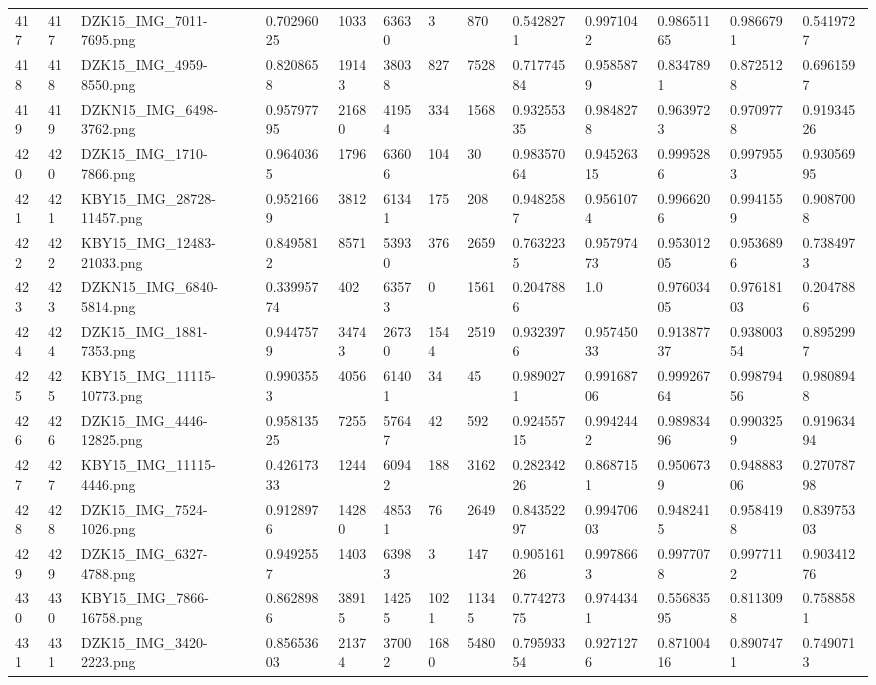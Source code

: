 \documentclass[11pt, a4paper, twoside]{report}
\begin{document}
\begin{longtable}[c]{@{}lllllllllllll@{}}
417 & 417 & DZK15\_IMG\_7011-7695.png & 0.70296025 & 1033 & 63630 & 3 & 870 & 0.5428271 & 0.9971042 & 0.98651165 & 0.9866791 & 0.5419727 \\
418 & 418 & DZK15\_IMG\_4959-8550.png & 0.8208658 & 19143 & 38038 & 827 & 7528 & 0.71774584 & 0.9585879 & 0.8347891 & 0.8725128 & 0.6961597 \\
419 & 419 & DZKN15\_IMG\_6498-3762.png & 0.95797795 & 21680 & 41954 & 334 & 1568 & 0.93255335 & 0.9848278 & 0.9639723 & 0.9709778 & 0.91934526 \\
420 & 420 & DZK15\_IMG\_1710-7866.png & 0.9640365 & 1796 & 63606 & 104 & 30 & 0.98357064 & 0.94526315 & 0.9995286 & 0.9979553 & 0.93056995 \\
421 & 421 & KBY15\_IMG\_28728-11457.png & 0.9521669 & 3812 & 61341 & 175 & 208 & 0.9482587 & 0.9561074 & 0.9966206 & 0.9941559 & 0.9087008 \\
422 & 422 & KBY15\_IMG\_12483-21033.png & 0.8495812 & 8571 & 53930 & 376 & 2659 & 0.7632235 & 0.95797473 & 0.95301205 & 0.9536896 & 0.7384973 \\
423 & 423 & DZKN15\_IMG\_6840-5814.png & 0.33995774 & 402 & 63573 & 0 & 1561 & 0.2047886 & 1.0 & 0.97603405 & 0.97618103 & 0.2047886 \\
424 & 424 & DZK15\_IMG\_1881-7353.png & 0.9447579 & 34743 & 26730 & 1544 & 2519 & 0.9323976 & 0.95745033 & 0.91387737 & 0.93800354 & 0.8952997 \\
425 & 425 & KBY15\_IMG\_11115-10773.png & 0.9903553 & 4056 & 61401 & 34 & 45 & 0.9890271 & 0.99168706 & 0.99926764 & 0.99879456 & 0.9808948 \\
426 & 426 & DZK15\_IMG\_4446-12825.png & 0.95813525 & 7255 & 57647 & 42 & 592 & 0.92455715 & 0.9942442 & 0.98983496 & 0.9903259 & 0.91963494 \\
427 & 427 & KBY15\_IMG\_11115-4446.png & 0.42617333 & 1244 & 60942 & 188 & 3162 & 0.28234226 & 0.8687151 & 0.9506739 & 0.94888306 & 0.27078798 \\
428 & 428 & DZK15\_IMG\_7524-1026.png & 0.9128976 & 14280 & 48531 & 76 & 2649 & 0.84352297 & 0.99470603 & 0.9482415 & 0.9584198 & 0.83975303 \\
429 & 429 & DZK15\_IMG\_6327-4788.png & 0.9492557 & 1403 & 63983 & 3 & 147 & 0.90516126 & 0.9978663 & 0.9977078 & 0.9977112 & 0.90341276 \\
430 & 430 & KBY15\_IMG\_7866-16758.png & 0.8628986 & 38915 & 14255 & 1021 & 11345 & 0.77427375 & 0.9744341 & 0.55683595 & 0.8113098 & 0.7588581 \\
431 & 431 & DZK15\_IMG\_3420-2223.png & 0.85653603 & 21374 & 37002 & 1680 & 5480 & 0.79593354 & 0.9271276 & 0.87100416 & 0.8907471 & 0.7490713 \\

\end{longtable}
\end{document}
